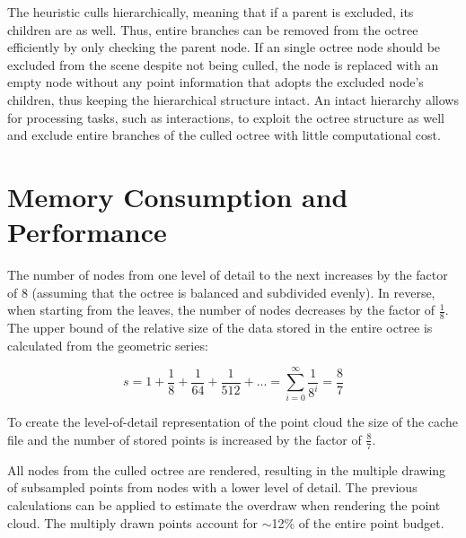 \par

The heuristic culls hierarchically, meaning that if a parent is excluded, its children are as well. Thus, entire branches can be removed from the octree efficiently by only checking the parent node. If an single octree node should be excluded from the scene despite not being culled, the node is replaced with an empty node without any point information that adopts the excluded node's children, thus keeping the hierarchical structure intact. An intact hierarchy allows for processing tasks, such as interactions, to exploit the octree structure as well and exclude entire branches of the culled octree with little computational cost. 


\section{Memory Consumption and Performance}
\label{sec:octree_memory}

The number of nodes from one level of detail to the next increases by the factor of $8$ (assuming that the octree is balanced and subdivided evenly). In reverse, when starting from the leaves, the number of nodes decreases by the factor of $\frac{1}{8}$. The upper bound of the relative size of the data stored in the entire octree is calculated from the geometric series: 


$$s = 1 + \frac{1}{8} + \frac{1}{64} + \frac{1}{512} + ... = \sum_{i = 0}^{\infty}{\frac{1}{8^i}} = \frac{8}{7}$$


To create the level-of-detail representation of the point cloud the size of the cache file and the number of stored points is increased by the factor of $\frac{8}{7}$. 

\par

All nodes from the culled octree are rendered, resulting in the multiple drawing of subsampled points from nodes with a lower level of detail. The previous calculations can be applied to estimate the overdraw when rendering the point cloud. The multiply drawn points account for $\sim$12\% of the entire point budget.



